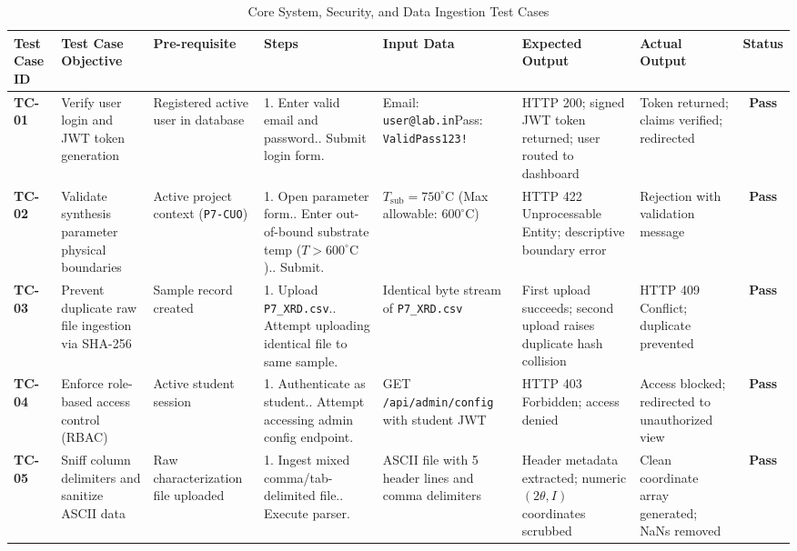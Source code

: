 \documentclass[12pt,a4paper,oneside]{report}
\begin{document}
{{{\begin{table}[!htbp]
\centering
\scriptsize
\setlength{\tabcolsep}{2.2pt}
\renewcommand{\arraystretch}{1.25}
\caption{Core System, Security, and Data Ingestion Test Cases}
\label{tab:tc_core}
\begin{tabular}{|p{0.9cm}|p{2.1cm}|p{1.5cm}|p{2.3cm}|p{1.7cm}|p{2.0cm}|p{1.9cm}|c|}
\hline
\textbf{Test Case ID} & \textbf{Test Case Objective} & \textbf{Pre-requisite} & \textbf{Steps} & \textbf{Input Data} & \textbf{Expected Output} & \textbf{Actual Output} & \textbf{Status} \\
\hline
\textbf{TC-01} & Verify user login and JWT token generation & Registered active user in database & 1. Enter valid email and password.\newline 2. Submit login form. & Email: \texttt{user@lab.in}\newline Pass: \texttt{ValidPass123!} & HTTP 200; signed JWT token returned; user routed to dashboard & Token returned; claims verified; redirected & \textbf{Pass} \\
\hline
\textbf{TC-02} & Validate synthesis parameter physical boundaries & Active project context (\texttt{P7-CUO}) & 1. Open parameter form.\newline 2. Enter out-of-bound substrate temp ($T > 600^\circ\text{C}$).\newline 3. Submit. & $T_{\text{sub}} = 750^\circ\text{C}$ (Max allowable: $600^\circ\text{C}$) & HTTP 422 Unprocessable Entity; descriptive boundary error & Rejection with validation message & \textbf{Pass} \\
\hline
\textbf{TC-03} & Prevent duplicate raw file ingestion via SHA-256 & Sample record created & 1. Upload \texttt{P7\_XRD.csv}.\newline 2. Attempt uploading identical file to same sample. & Identical byte stream of \texttt{P7\_XRD.csv} & First upload succeeds; second upload raises duplicate hash collision & HTTP 409 Conflict; duplicate prevented & \textbf{Pass} \\
\hline
\textbf{TC-04} & Enforce role-based access control (RBAC) & Active student session & 1. Authenticate as student.\newline 2. Attempt accessing admin config endpoint. & GET \newline\texttt{/api/admin/config} with student JWT & HTTP 403 Forbidden; access denied & Access blocked; redirected to unauthorized view & \textbf{Pass} \\
\hline
\textbf{TC-05} & Sniff column delimiters and sanitize ASCII data & Raw characterization file uploaded & 1. Ingest mixed comma/tab-delimited file.\newline 2. Execute parser. & ASCII file with 5 header lines and comma delimiters & Header metadata extracted; numeric $(2\theta, I)$ coordinates scrubbed & Clean coordinate array generated; NaNs removed & \textbf{Pass} \\
\hline
\end{tabular}
\end{table}

}}}
\end{document}
